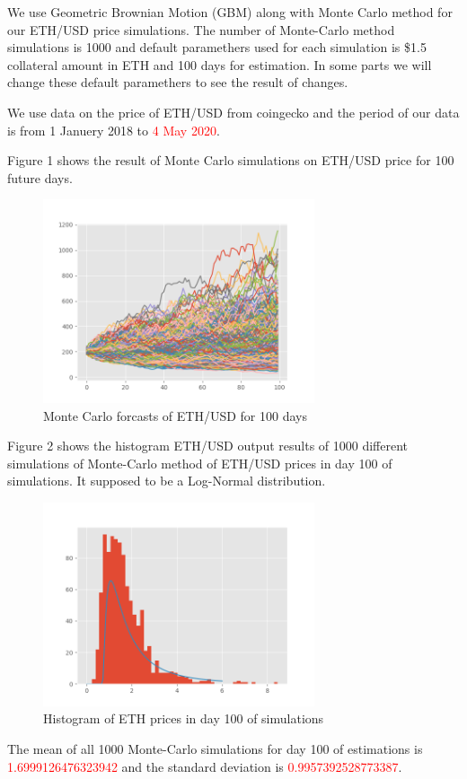 We use Geometric Brownian Motion (GBM) along with Monte Carlo method for our ETH/USD price simulations. The number of Monte-Carlo method simulations is 1000 and default paramethers used for each simulation is \$1.5 collateral amount in ETH and 100 days for estimation. In some parts we will change these default paramethers to see the result of changes.

We use data on the price of ETH/USD from coingecko and the period of our data is from 1 Januery 2018 to \textcolor{red}{4 May 2020}.

Figure 1 shows the result of Monte Carlo simulations on ETH/USD price for 100 future days.
\begin{figure} [H]
\centering
\includegraphics[width=8cm]{Monte-Carlo}
\caption{Monte Carlo forcasts of ETH/USD for 100 days}
\end{figure}
Figure 2 shows the histogram ETH/USD output results of 1000 different simulations of Monte-Carlo method of ETH/USD prices in day 100 of simulations. It supposed to be a Log-Normal distribution.
\begin{figure} [H]
\centering
\includegraphics[width=8cm]{outputs}
\caption{Histogram of ETH prices in day 100 of simulations}
\end{figure}

The mean of all 1000 Monte-Carlo simulations for day 100 of estimations is \textcolor{red}{1.6999126476323942} and the standard deviation is \textcolor{red}{0.9957392528773387}.

